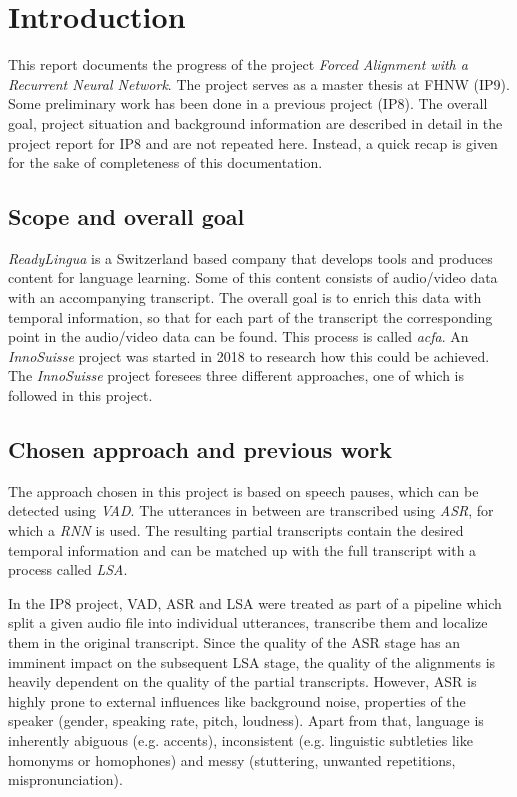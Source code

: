 \section{Introduction}\label{intro}
This report documents the progress of the project \textit{Forced Alignment with a Recurrent Neural Network}. The project serves as a master thesis at \ac{FHNW} (IP9). Some preliminary work has been done in a previous project (IP8). The overall goal, project situation and background information are described in detail in the project report for IP8 and are not repeated here. Instead, a quick recap is given for the sake of completeness of this documentation.

\subsection{Scope and overall goal}
\textit{ReadyLingua} is a Switzerland based company that develops tools and produces content for language learning. Some of this content consists of audio/video data with an accompanying transcript. The overall goal is to enrich this data with temporal information, so that for each part of the transcript the corresponding point in the audio/video data can be found. This process is called \textit{ac{fa}}. An \textit{InnoSuisse} project was started in 2018 to research how this could be achieved. The \textit{InnoSuisse} project foresees three different approaches, one of which is followed in this project.

\subsection{Chosen approach and previous work}
The approach chosen in this project is based on speech pauses, which can be detected using \textit{\ac{VAD}}. The utterances in between are transcribed using \textit{\ac{ASR}}, for which a \textit{\ac{RNN}} is used. The resulting partial transcripts contain the desired temporal information and can be matched up with the full transcript with a process called \textit{\ac{LSA}}.

In the IP8 project, \ac{VAD}, \ac{ASR} and \ac{LSA} were treated as part of a pipeline which split a given audio file into individual utterances, transcribe them and localize them in the original transcript. Since the quality of the \ac{ASR} stage has an imminent impact on the subsequent \ac{LSA} stage, the quality of the alignments is heavily dependent on the quality of the partial transcripts. However, \ac{ASR} is highly prone to external influences like background noise, properties of the speaker (gender, speaking rate, pitch, loudness). Apart from that, language is inherently abiguous (e.g. accents), inconsistent (e.g. linguistic subtleties like homonyms or homophones) and messy (stuttering, unwanted repetitions, mispronunciation).

